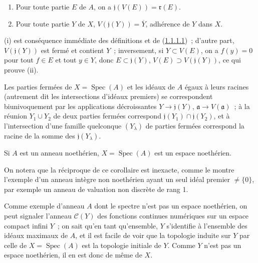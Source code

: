 \begin{proposition}[1.1.4]
\label{I.1.1.4-fr}
\begin{enumerate}
  \item[\rm(i)] Pour toute partie $E$ de $A$, on a
  $\mathfrak{j}(V(E))=\mathfrak{r}(E)$.
  \item[\rm(ii)] Pour toute partie $Y$ de $X$,
  $V(\mathfrak{j}(Y))=\overline{Y}$, adhérence de $Y$ dans $X$.
\end{enumerate}
\end{proposition}

(i) est conséquence immédiate des définitions et de
(\hyperref[I.1.1.1.1-fr]{1.1.1.1})~; d'autre part,
$V(\mathfrak{j}(Y))$ est fermé et contient $Y$~; inversement, si
$Y\subset V(E)$, on a $f(y)=0$ pour tout $f\in E$ et tout $y\in Y$, donc
$E\subset\mathfrak{j}(Y)$, $V(E)\supset V(\mathfrak{j}(Y))$, ce qui prouve
(ii).

\begin{corollary}[1.1.5]
\label{I.1.1.5-fr}
Les parties fermées de $X=\operatorname{Spec}(A)$ et les idéaux de $A$ égaux
à leurs racines (autrement dit les intersections d'idéaux premiers) se
correspondent biunivoquement par les applications décroissantes
$Y\to\mathfrak{j}(Y)$, $\mathfrak{a}\to V(\mathfrak{a})$~; à la
réunion $Y_1\cup Y_2$ de deux parties fermées correspond
$\mathfrak{j}(Y_1)\cap\mathfrak{j}(Y_2)$, et à l'intersection d'une famille
quelconque $(Y_\lambda)$ de parties fermées correspond la racine de la somme
des $\mathfrak{j}(Y_\lambda)$.
\end{corollary}

\begin{corollary}[1.1.6]
\label{I.1.1.6-fr}
Si $A$ est un anneau noethérien, $X=\operatorname{Spec}(A)$ est un espace
noethérien.
\end{corollary}

On notera que la réciproque de ce corollaire est inexacte, comme le montre
l'exemple d'un anneau intègre non noethérien ayant un seul idéal premier
$\neq\{0\}$, par exemple un anneau de valuation non discrète de rang 1.

Comme exemple d'anneau $A$ dont le spectre n'est pas un espace noethérien, on
peut signaler l'anneau $\mathcal{C}(Y)$ des fonctions continues numériques sur
un espace compact infini $Y$~; on sait qu'en tant qu'ensemble, $Y$ s'identifie
à l'ensemble des idéaux maximaux de $A$, et il est facile de voir que la
topologie induite sur $Y$ par celle de $X=\operatorname{Spec}(A)$ est la
topologie initiale de $Y$. Comme $Y$ n'est pas un espace noethérien, il en est
donc de même de $X$.

